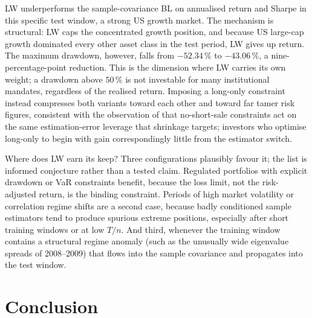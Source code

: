 \documentclass[a4paper,11pt]{article}
\theoremstyle{plain}
\theoremstyle{definition}
\begin{document}
LW underperforms the sample-covariance BL on annualised return and
Sharpe in this specific test window, a strong US growth market. The
mechanism is structural: LW caps the concentrated growth position, and
because US large-cap growth dominated every other asset class in the
test period, LW gives up return. The maximum drawdown, however, falls
from $-52.34\,\%$ to $-43.06\,\%$, a nine-percentage-point reduction.
This is the dimension where LW carries its own weight; a drawdown above
$50\,\%$ is not investable for many institutional mandates, regardless
of the realised return. Imposing a long-only constraint instead compresses both
variants toward each other and toward far tamer risk figures, consistent
with the observation of \citet[p.~1652]{JagannathanMa2003} that
no-short-sale constraints act on the same estimation-error leverage that
shrinkage targets; investors who optimise long-only to begin with gain
correspondingly little from the estimator switch.

Where does LW earn its keep? Three configurations plausibly favour it;
the list is informed conjecture rather than a tested claim. Regulated
portfolios
with explicit drawdown or VaR constraints benefit, because the loss
limit, not the risk-adjusted return, is the binding constraint. Periods
of high market volatility or correlation regime shifts are a second
case, because badly conditioned sample estimators tend to produce
spurious extreme positions, especially after short training windows or
at low $T/n$. And third, whenever the training window contains a
structural regime anomaly (such as the unusually wide eigenvalue spreads
of 2008--2009) that flows into the sample covariance and propagates into
the test window.

\section{Conclusion}
\label{sec:conclusion}
\end{document}
